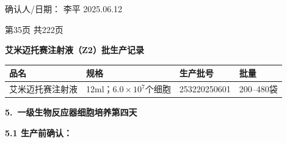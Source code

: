 \documentclass[UTF8,10pt,a4paper,fontset=fandol]{ctexart}
\newcommand{\fieldvalue}[1]{#1}
\newcommand{\handwritten}[1]{#1}
\begin{document}
\noindent
确认人/日期：
\fieldvalue{\handwritten{李平}}
\quad
\fieldvalue{\handwritten{2025.06.12}}

\begin{center}
第35页 共222页
\end{center}

\newpage

\begin{center}
\textbf{艾米迈托赛注射液（Z2）批生产记录}

\vspace{2mm}
\begin{tabularx}{\textwidth}{|>{\centering\arraybackslash}X|>{\centering\arraybackslash}X|>{\centering\arraybackslash}X|>{\centering\arraybackslash}X|}
\hline
品名 & 规格 & 生产批号 & 批量 \\
\hline
\fieldvalue{艾米迈托赛注射液} &
\fieldvalue{12ml；$6.0\times10^{7}$个细胞} &
\fieldvalue{\handwritten{253220250601}} &
\fieldvalue{200--480袋} \\
\hline
\end{tabularx}
\end{center}

\noindent\textbf{5.\ 一级生物反应器细胞培养第四天}

\medskip
\noindent\textbf{5.1 生产前确认：}
\end{document}
